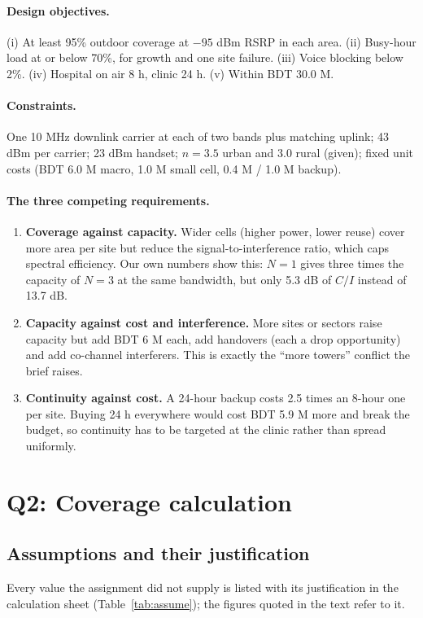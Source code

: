 \documentclass[9pt,a4paper]{article}
\begin{document}
\paragraph{Design objectives.} (i) At least 95\% outdoor coverage at $-95$ dBm RSRP in each
area. (ii) Busy-hour load at or below 70\%, for growth and one site failure. (iii) Voice blocking
below 2\%. (iv) Hospital on air 8 h, clinic 24 h. (v) Within BDT 30.0 M.

\paragraph{Constraints.} One 10 MHz downlink carrier at each of two bands plus matching uplink;
43 dBm per carrier; 23 dBm handset; $n=3.5$ urban and $3.0$ rural (given); fixed unit costs
(BDT 6.0 M macro, 1.0 M small cell, 0.4 M / 1.0 M backup).

\paragraph{The three competing requirements.}
\begin{enumerate}[leftmargin=1.4em,itemsep=1pt,topsep=2pt]
\item \textbf{Coverage against capacity.} Wider cells (higher power, lower reuse) cover more area
per site but reduce the signal-to-interference ratio, which caps spectral efficiency. Our own
numbers show this: $N=1$ gives three times the capacity of $N=3$ at the same bandwidth, but only
5.3 dB of $C/I$ instead of 13.7 dB.
\item \textbf{Capacity against cost and interference.} More sites or sectors raise capacity but
add BDT 6 M each, add handovers (each a drop opportunity) and add co-channel interferers. This is
exactly the ``more towers'' conflict the brief raises.
\item \textbf{Continuity against cost.} A 24-hour backup costs 2.5 times an 8-hour one per site.
Buying 24 h everywhere would cost BDT 5.9 M more and break the budget, so continuity has to be
targeted at the clinic rather than spread uniformly.
\end{enumerate}

\section{Q2: Coverage calculation}
\label{sec:q2}

\subsection{Assumptions and their justification}
Every value the assignment did not supply is listed with its justification in the calculation
sheet (Table~\ref{tab:assume}); the figures quoted in the text refer to it.
\end{document}

